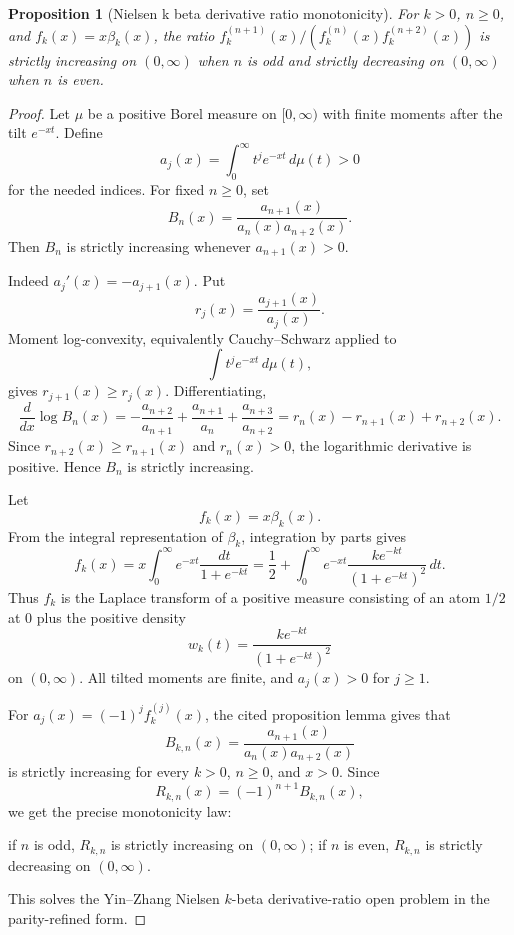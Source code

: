 \documentclass[11pt]{article}
\numberwithin{equation}{section}
\newtheorem{proposition}[theorem]{Proposition}
\theoremstyle{definition}
\theoremstyle{remark}
\newcommand{\1}{\mathbf 1}
\begin{document}
\begin{proposition}[Nielsen k beta derivative ratio monotonicity]
\label{res:nielsen-k-beta-derivative-ratio-monotonicity}
For \(k>0\), \(n\ge0\), and \(f_k(x)=x\beta_k(x)\), the ratio \(f_k^{(n+1)}(x)/(f_k^{(n)}(x)f_k^{(n+2)}(x))\) is strictly increasing on \((0,\infty)\) when \(n\) is odd and strictly decreasing on \((0,\infty)\) when \(n\) is even.
\end{proposition}

\begin{proof}
Let \(\mu\) be a positive Borel measure on \([0,\infty)\) with finite moments after the tilt \(e^{-xt}\). Define
\[
a_j(x)=\int_0^\infty t^j e^{-xt}\,d\mu(t)>0
\]
for the needed indices. For fixed \(n\ge0\), set
\[
B_n(x)=\frac{a_{n+1}(x)}{a_n(x)a_{n+2}(x)}.
\]
Then \(B_n\) is strictly increasing whenever \(a_{n+1}(x)>0\).

Indeed \(a_j'(x)=-a_{j+1}(x)\). Put
\[
r_j(x)=\frac{a_{j+1}(x)}{a_j(x)}.
\]
Moment log-convexity, equivalently Cauchy--Schwarz applied to
\[
\int t^j e^{-xt}\,d\mu(t),
\]
gives \(r_{j+1}(x)\ge r_j(x)\). Differentiating,
\[
\frac{d}{dx}\log B_n(x)
=-\frac{a_{n+2}}{a_{n+1}}
+\frac{a_{n+1}}{a_n}
+\frac{a_{n+3}}{a_{n+2}}
=r_n(x)-r_{n+1}(x)+r_{n+2}(x).
\]
Since \(r_{n+2}(x)\ge r_{n+1}(x)\) and \(r_n(x)>0\), the logarithmic derivative is positive. Hence \(B_n\) is strictly increasing.

Let
\[
f_k(x)=x\beta_k(x).
\]
From the integral representation of \(\beta_k\), integration by parts gives
\[
f_k(x)
=x\int_0^\infty e^{-xt}\frac{dt}{1+e^{-kt}}
=\frac12+\int_0^\infty e^{-xt}\frac{k e^{-kt}}{(1+e^{-kt})^2}\,dt.
\]
Thus \(f_k\) is the Laplace transform of a positive measure consisting of an atom \(1/2\) at \(0\) plus the positive density
\[
w_k(t)=\frac{k e^{-kt}}{(1+e^{-kt})^2}
\]
on \((0,\infty)\). All tilted moments are finite, and \(a_{j}(x)>0\) for \(j\ge1\).

For \(a_j(x)=(-1)^j f_k^{(j)}(x)\), the cited proposition lemma gives that
\[
B_{k,n}(x)=\frac{a_{n+1}(x)}{a_n(x)a_{n+2}(x)}
\]
is strictly increasing for every \(k>0\), \(n\ge0\), and \(x>0\). Since
\[
R_{k,n}(x)=(-1)^{n+1}B_{k,n}(x),
\]
we get the precise monotonicity law:

if \(n\) is odd, \(R_{k,n}\) is strictly increasing on \((0,\infty)\);
if \(n\) is even, \(R_{k,n}\) is strictly decreasing on \((0,\infty)\).

This solves the Yin--Zhang Nielsen \(k\)-beta derivative-ratio open problem in the parity-refined form.
\end{proof}
\end{document}
